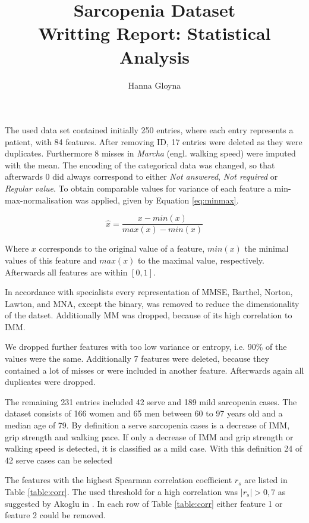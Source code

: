 \documentclass[11pt]{article}
\author{Hanna Gloyna}
\title{Sarcopenia Dataset\\
		\large Writting Report: Statistical Analysis}
\date{}
\begin{document}
\twocolumn
\maketitle
\thispagestyle{fancy}
The used data set contained initially 250 entries, where each entry represents a patient, with 84 features. After removing ID, 17 entries were deleted as they were duplicates. Furthermore 8 misses in \emph{Marcha} (engl. walking speed) were imputed with the mean. The encoding of the categorical data was changed, so that afterwards $0$ did always correspond to either \emph{Not answered}, \emph{Not required} or \emph{Regular value}. To obtain comparable values for variance of each feature a min-max-normalisation was applied, given by Equation \ref{eq:minmax}.

\begin{equation}\label{eq:minmax}
\hat{x} = \frac{x-min(x)}{max(x)-min(x)}
\end{equation}

Where $x$ corresponds to the original value of a feature, $min(x)$ the minimal values of this feature and $max(x)$ to the maximal value, respectively. Afterwards all features are within $\left[0,1\right]$.

In accordance with specialists every representation of MMSE, Barthel, Norton, Lawton, and MNA, except the binary, was removed to reduce the dimensionality of the datset. Additionally MM was dropped, because of its high correlation to IMM.

We dropped further features with too low variance or entropy, i.e. 90\% of the values were the same. Additionally 7 features were deleted, because they contained a lot of misses or were included in another feature. Afterwards again all duplicates were dropped.

The remaining 231 entries included 42 serve and 189 mild sarcopenia cases. The dataset consists of 166 women and 65 men between 60 to 97 years old and a median age of 79. By definition a serve sarcopenia cases is a decrease of IMM, grip strength and walking pace. If only a decrease of IMM and grip strength or walking speed is detected, it is classified as a mild case. With this definition 24 of 42 serve cases can be selected

The features with the highest Spearman correlation coefficient $r_s$ are listed in Table \ref{table:corr}. The used threshold for a high correlation was $|r_s| > 0,7$ as suggested by Akoglu in \cite{akoglu_users_2018}. In each row of Table \ref{table:corr} either feature 1 or feature 2 could be removed.
\end{document}
